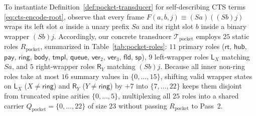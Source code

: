 \documentclass[11pt,reqno]{amsart}
\numberwithin{equation}{section}
\theoremstyle{plain}
\theoremstyle{definition}
\theoremstyle{remark}
\begin{document}
To instantiate Definition~\ref{def:pocket-transducer} for self-describing CTS terms \eqref{eq:cts-encode-root}, observe that every frame $F(a, b, j) \equiv (S a)((S b) j)$ wraps its left slot $a$ inside a unary prefix $S a$ and its right slot $b$ inside a binary wrapper $(S b) j$. Accordingly, our concrete transducer $\mathcal{T}_{\mathrm{pocket}}$ employs $25$ static roles $R_{\mathrm{pocket}}$, summarized in Table~\ref{tab:pocket-roles}: $11$ primary roles ($\mathsf{rt}$, $\mathsf{hub}$, $\mathsf{pay}$, $\mathsf{ring}$, $\mathsf{body}$, $\mathsf{tmpl}$, $\mathsf{queue}$, $\mathsf{ver}_2$, $\mathsf{ver}_3$, $\mathsf{fld}$, $\mathsf{sp}$), $9$ left-wrapper roles $\mathsf{L}_X$ matching $S a$, and $5$ right-wrapper roles $\mathsf{R}_Y$ matching $(S b) j$. Because all inner non-ring roles take at most $16$ summary values in $\{0,\dots,15\}$, shifting valid wrapper states on $\mathsf{L}_X$ ($X \ne \mathsf{ring}$) and $\mathsf{R}_Y$ ($Y \ne \mathsf{ring}$) by $+7$ into $\{7,\dots,22\}$ keeps them disjoint from truncated spine arities $\{0,\dots,5\}$, multiplexing all $25$ roles into a shared carrier $Q_{\mathrm{pocket}} = \{0,\dots,22\}$ of size $23$ without passing $R_{\mathrm{pocket}}$ to Pass~2.
\end{document}
